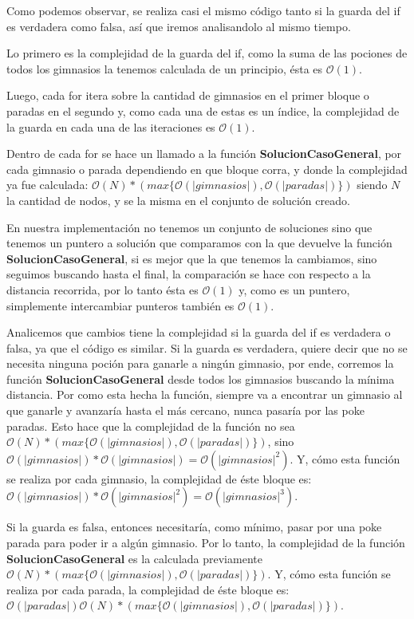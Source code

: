 Como podemos observar, se realiza casi el mismo código tanto si la guarda del if es verdadera como falsa, así que iremos analisandolo al mismo tiempo.

Lo primero es la complejidad de la guarda del if, como la suma de las pociones de todos los gimnasios la tenemos calculada de un principio, ésta es $\mathcal{O}(1)$.

Luego, cada for itera sobre la cantidad de gimnasios en el primer bloque o paradas en el segundo y, como cada una de estas es un índice, la complejidad de la guarda en cada una de las iteraciones es $\mathcal{O}(1)$.

Dentro de cada for se hace un llamado a la función \textbf{SolucionCasoGeneral}, por cada gimnasio o parada dependiendo en que bloque corra, y donde la complejidad ya fue calculada: $\mathcal{O}(N) * (max\{\mathcal{O}(|gimnasios|), \mathcal{O}(|paradas|)\})$ siendo $N$ la cantidad de nodos, y se la misma en el conjunto de solución creado.

En nuestra implementación no tenemos un conjunto de soluciones sino que tenemos un puntero a solución que comparamos con la que devuelve la función \textbf{SolucionCasoGeneral}, si es mejor que la que tenemos la cambiamos, sino seguimos buscando hasta el final, la comparación se hace con respecto a la distancia recorrida, por lo tanto ésta es $\mathcal{O}(1)$ y, como es un puntero, simplemente intercambiar punteros también es $\mathcal{O}(1)$.

Analicemos que cambios tiene la complejidad si la guarda del if es verdadera o falsa, ya que el código es similar. Si la guarda es verdadera, quiere decir que no se necesita ninguna poción para ganarle a ningún gimnasio, por ende, corremos la función \textbf{SolucionCasoGeneral} desde todos los gimnasios buscando la mínima distancia. Por como esta hecha la función, siempre va a encontrar un gimnasio al que ganarle y avanzaría hasta el más cercano, nunca pasaría por las poke paradas. Esto hace que la complejidad de la función no sea $\mathcal{O}(N) * (max\{\mathcal{O}(|gimnasios|), \mathcal{O}(|paradas|)\})$, sino $\mathcal{O}(|gimnasios|) * \mathcal{O}(|gimnasios|) = \mathcal{O}(|gimnasios|^2)$. Y, cómo esta función se realiza por cada gimnasio, la complejidad de éste bloque es: $\mathcal{O}(|gimnasios|)* \mathcal{O}(|gimnasios|^2) = \mathcal{O}(|gimnasios|^3)$.

Si la guarda es falsa, entonces necesitaría, como mínimo, pasar por una poke parada para poder ir a algún gimnasio. Por lo tanto, la complejidad de la función \textbf{SolucionCasoGeneral} es la calculada previamente $\mathcal{O}(N) * (max\{\mathcal{O}(|gimnasios|), \mathcal{O}(|paradas|)\})$. Y, cómo esta función se realiza por cada parada, la complejidad de éste bloque es: $\mathcal{O}(|paradas|) \mathcal{O}(N) * (max\{\mathcal{O}(|gimnasios|), \mathcal{O}(|paradas|)\})$.

